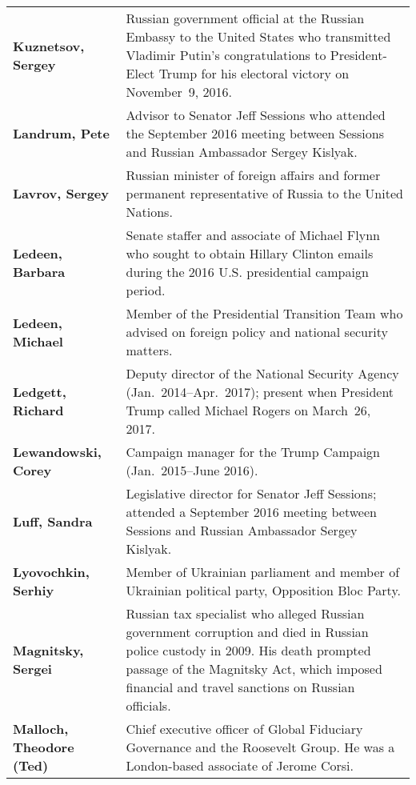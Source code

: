 \begin{longtable}{ p{} p{} }
    \textbf{Kuznetsov, Sergey} & Russian government official at the Russian Embassy to the United States who transmitted Vladimir Putin's congratulations to President-Elect Trump for his electoral victory on November~9, 2016. \\

    \textbf{Landrum, Pete} & Advisor to Senator Jeff Sessions who attended the September 2016 meeting between Sessions and Russian Ambassador Sergey Kislyak. \\

    \textbf{Lavrov, Sergey} & Russian minister of foreign affairs and former permanent representative of Russia to the United Nations. \\

    \textbf{Ledeen, Barbara} & Senate staffer and associate of Michael Flynn who sought to obtain Hillary Clinton emails during the 2016 U.S. presidential campaign period. \\

    \textbf{Ledeen, Michael} & Member of the Presidential Transition Team who advised on foreign policy and national security matters. \\

    \textbf{Ledgett, Richard} & Deputy director of the National Security Agency (Jan.~2014--Apr.~2017); present when President Trump called Michael Rogers on March~26, 2017. \\

    \textbf{Lewandowski, Corey} & Campaign manager for the Trump Campaign (Jan.~2015--June 2016). \\

    \textbf{Luff, Sandra} & Legislative director for Senator Jeff Sessions; attended a September 2016 meeting between Sessions and Russian Ambassador Sergey Kislyak. \\

    \textbf{Lyovochkin, Serhiy} & Member of Ukrainian parliament and member of Ukrainian political party, Opposition Bloc Party. \\

    \textbf{Magnitsky, Sergei} & Russian tax specialist who alleged Russian government corruption and died in Russian police custody in 2009. His death prompted passage of the Magnitsky Act, which imposed financial and travel sanctions on Russian officials. \\

    \textbf{Malloch, Theodore (Ted)} & Chief executive officer of Global Fiduciary Governance and the Roosevelt Group. He was a London-based associate of Jerome Corsi. \\


\end{longtable}
